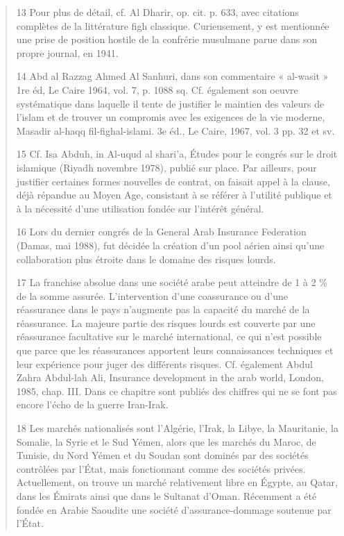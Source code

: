 \begin{quote}
13 Pour plus de détail, cf. Al Dharir, op. cit. p. 633, avec citations complètes de la littérature figh classique. Curieusement, y est mentionnée une prise de position hostile de la confrérie musulmane parue dans son propre journal, en 1941.

14 Abd al Razzag Ahmed Al Sanhuri, dans son commentaire « al-wasit » 1re éd, Le Caire 1964, vol. 7, p. 1088 sq. Cf. également son oeuvre systématique dans laquelle il tente de justifier le maintien des valeurs de l’islam et de trouver un compromis avec les exigences de la vie moderne, Masadir al-haqq fil-fighal-islami. 3e éd., Le Caire, 1967, vol. 3 pp. 32 et sv.

15 Cf. Isa Abduh, in Al-uqud al shari’a, Études pour le congrés sur le droit islamique (Riyadh novembre 1978), publié sur place. Par ailleurs, pour justifier certaines formes nouvelles de contrat, on faisait appel à la clause, déjà répandue au Moyen Age, consistant à se référer à l’utilité publique et à la nécessité d’une utilisation fondée sur l’intérêt général.

16 Lors du dernier congrés de la General Arab Insurance Federation (Damas, mai 1988), fut décidée la création d’un pool aérien ainsi qu’une collaboration plus étroite dans le domaine des risques lourds.

17 La franchise absolue dans une société arabe peut atteindre de 1 à 2 \% de la somme assurée. L’intervention d’une coassurance ou d’une réassurance dans le pays n’augmente pas la capacité du marché de la réassurance. La majeure partie des risques lourds est couverte par une réassurance facultative sur le marché international, ce qui n’est possible que parce que les réassurances apportent leurs connaissances techniques et leur expérience pour juger des différents risques. Cf. également Abdul Zahra Abdul-lah Ali, Insurance development in the arab world, London, 1985, chap. III. Dans ce chapitre sont publiés des chiffres qui ne se font pas encore l’écho de la guerre Iran-Irak.

18 Les marchés nationalisés sont l’Algérie, l’Irak, la Libye, la Mauritanie, la Somalie, la Syrie et le Sud Yémen, alors que les marchés du Maroc, de Tunisie, du Nord Yémen et du Soudan sont dominés par des sociétés contrôlées par l’État, mais fonctionnant comme des sociétés privées. Actuellement, on trouve un marché relativement libre en Égypte, au Qatar, dans les Émirats ainsi que dans le Sultanat d’Oman. Récemment a été fondée en Arabie Saoudite une société d’assurance-dommage soutenue par l’État.


\end{quote}
